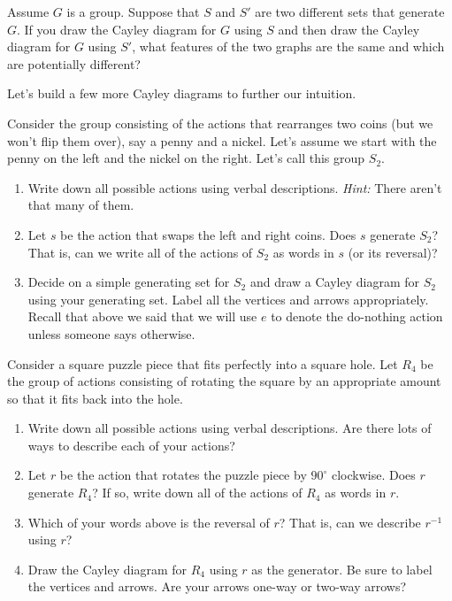 \begin{exercise}\label{exer:changing_generators_for_Cayley_diagram}
Assume $G$ is a group.  Suppose that $S$ and $S'$ are two different sets that generate $G$.  If you draw the Cayley diagram for $G$ using $S$ and then draw the Cayley diagram for $G$ using $S'$, what features of the two graphs are the same and which are potentially different?
\end{exercise}

Let's build a few more Cayley diagrams to further our intuition.

\begin{exercise}\label{exer:introducing_S2}
Consider the group consisting of the actions that rearranges two coins (but we won't flip them over), say a penny and a nickel.  Let's assume we start with the penny on the left and the nickel on the right.  Let's call this group $S_2$.

\begin{enumerate}[label=\rm{(\alph*)}]
\item Write down all possible actions using verbal descriptions.  \emph{Hint:} There aren't that many of them.
\item Let $s$ be the action that swaps the left and right coins.  Does $s$ generate $S_2$?  That is, can we write all of the actions of $S_2$ as words in $s$ (or its reversal)?
\item Decide on a simple generating set for $S_2$ and draw a Cayley diagram for $S_2$ using your generating set.  Label all the vertices and arrows appropriately.  Recall that above we said that we will use $e$ to denote the do-nothing action unless someone says otherwise.
\end{enumerate}
\end{exercise}

\begin{exercise}\label{exer:introducing_R4}
Consider a square puzzle piece that fits perfectly into a square hole.  Let $R_4$ be the group of actions consisting of rotating the square by an appropriate amount so that it fits back into the hole. 
\begin{enumerate}[label=\rm{(\alph*)}]
\item Write down all possible actions using verbal descriptions.  Are there lots of ways to describe each of your actions?
\item Let $r$ be the action that rotates the puzzle piece by $90^\circ$ clockwise.  Does $r$ generate $R_4$?  If so, write down all of the actions of $R_4$ as words in $r$.
\item Which of your words above is the reversal of $r$?  That is, can we describe $r^{-1}$ using $r$?
\item Draw the Cayley diagram for $R_4$ using $r$ as the generator.  Be sure to label the vertices and arrows.  Are your arrows one-way or two-way arrows?
\end{enumerate}
\end{exercise}

